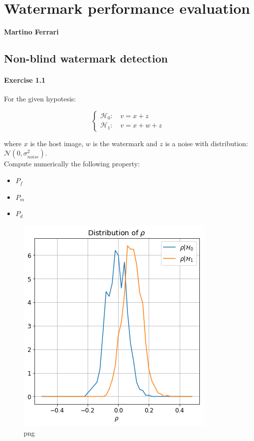 \section{Watermark performance
evaluation}\label{watermark-performance-evaluation}

\textbf{Martino Ferrari}

\subsection{Non-blind watermark
detection}\label{non-blind-watermark-detection}

\paragraph{Exercise 1.1}\label{exercise-1.1}

For the given hypotesis:

\[
\begin{cases}
    \mathcal{H}_0:\quad v = x+z \\
    \mathcal{H}_1:\quad v = x+w+z
\end{cases}
\]

where \(x\) is the host image, \(w\) is the watermark and \(z\) is a
noise with distribution: \(\mathcal{N}(0,\sigma_{noise}^2)\).\\
Compute numerically the following property:

\begin{itemize}
\tightlist
\item
  \(P_f\)
\item
  \(P_m\)
\item
  \(P_d\)
\end{itemize}

\begin{figure}
\centering
\includegraphics{output_2_0.png}
\caption{png}
\end{figure}

